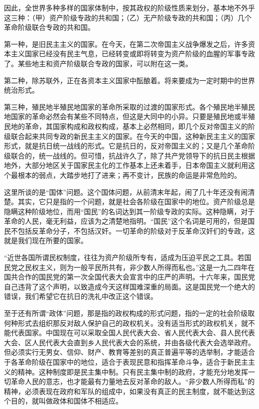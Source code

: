 \documentclass[UTF8, 12pt, a4paper]{ctexrep}
\begin{document}
因此，全世界多种多样的国家体制中，按其政权的阶级性质来划分，基本地不外乎这三种：（甲）资产阶级专政的共和国；（乙）无产阶级专政的共和国；（丙）几个革命阶级联合专政的共和国。

第一种，是旧民主主义的国家。在今天，在第二次帝国主义战争爆发之后，许多资本主义国家已经没有民主气息，已经转变或即将转变为资产阶级的血腥的军事专政了。某些地主和资产阶级联合专政的国家，可以附在这一类。

第二种，除苏联外，正在各资本主义国家中酝酿着。将来要成为一定时期中的世界统治形式。

第三种，殖民地半殖民地国家的革命所采取的过渡的国家形式。各个殖民地半殖民地国家的革命必然会有某些不同特点，但这是大同中的小异。只要是殖民地或半殖民地的革命，其国家构成和政权构成，基本上必然相同，即几个反对帝国主义的阶级联合起来共同专政的新民主主义的国家。在今天的中国，这种新民主主义的国家形式，就是抗日统一战线的形式。它是抗日的，反对帝国主义的；又是几个革命阶级联合的，统一战线的。但可惜，抗战许久了，除了共产党领导下的抗日民主根据地外，大部分地区关于国家民主化的工作基本上还未着手，日本帝国主义就利用这个最根本的弱点，大踏步地打了进来；再不变计，民族的命运是非常危险的。

这里所谈的是“国体”问题。这个国体问题，从前清末年起，闹了几十年还没有闹清楚。其实，它只是指的一个问题，就是社会各阶级在国家中的地位。资产阶级总是隐瞒这种阶级地位，而用“国民”的名词达到其一阶级专政的实际。这种隐瞒，对于革命的人民，毫无利益，应该为之清楚地指明。“国民”这个名词是可用的，但是国民不包括反革命分子，不包括汉奸。一切革命的阶级对于反革命汉奸们的专政，这就是我们现在所要的国家。

“近世各国所谓民权制度，往往为资产阶级所专有，适成为压迫平民之工具。若国民党之民权主义，则为一般平民所共有，非少数人所得而私也。”这是一九二四年在国共合作的国民党的第一次全国代表大会宣言中的庄严的声明。十六年来，国民党自己违背了这个声明，以致造成今天这样国难深重的局面。这是国民党一个绝大的错误，我们希望它在抗日的洗礼中改正这个错误。

至于还有所谓“政体”问题，那是指的政权构成的形式问题，指的一定的社会阶级取何种形式去组织那反对敌人保护自己的政权机关。没有适当形式的政权机关，就不能代表国家。中国现在可以采取全国人民代表大会、省人民代表大会、县人民代表大会、区人民代表大会直到乡人民代表大会的系统，并由各级代表大会选举政府。但必须实行无男女、信仰、财产、教育等差别的真正普遍平等的选举制，才能适合于各革命阶级在国家中的地位，适合于表现民意和指挥革命斗争，适合于新民主主义的精神。这种制度即是民主集中制。只有民主集中制的政府，才能充分地发挥一切革命人民的意志，也才能最有力量地去反对革命的敌人。“非少数人所得而私”的精神，必须表现在政府和军队的组成中，如果没有真正的民主制度，就不能达到这个目的，就叫做政体和国体不相适应。
\end{document}
